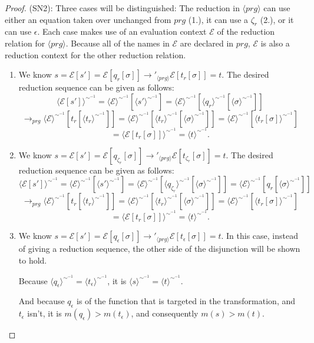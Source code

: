 \begin{proposition}
\begin{proof}
(SN2): Three cases will be distinguished: The reduction in $\langle prg \rangle$ can use either an equation taken over unchanged from $prg$ (1.), it can use a $\zeta_r$ (2.), or it can use $\epsilon$. Each case makes use of an evaluation context $\mathcal{E}$ of the reduction relation for $\langle prg \rangle$. Because all of the names in $\mathcal{E}$ are declared in $prg$, $\mathcal{E}$ is also a reduction context for the other reduction relation.
\begin{enumerate}
\item We know $s = \mathcal{E}[s'] = \mathcal{E}[q_r[\sigma]] \longrightarrow'_{\langle prg \rangle} \mathcal{E}[t_r[\sigma]] = t$. The desired reduction sequence can be given as follows:
\[
\langle \mathcal{E}[s'] \rangle^{\sim^{-1}} = \langle \mathcal{E} \rangle^{\sim^{-1}}[\langle s' \rangle^{\sim^{-1}}] = \langle \mathcal{E} \rangle^{\sim^{-1}}[\langle q_r \rangle^{\sim^{-1}}[\langle \sigma \rangle^{\sim^{-1}}]]
\]
\[
 \longrightarrow_{prg} \langle \mathcal{E} \rangle^{\sim^{-1}}[t_r[\langle t_r \rangle^{\sim^{-1}}]] = \langle \mathcal{E} \rangle^{\sim^{-1}}[\langle t_r \rangle^{\sim^{-1}}[\langle \sigma \rangle^{\sim^{-1}}]] = \langle \mathcal{E} \rangle^{\sim^{-1}}[\langle t_r[\sigma] \rangle^{\sim^{-1}}]
\]
\[
= \langle \mathcal{E}[t_r[\sigma]] \rangle^{\sim^{-1}} = \langle t \rangle^{\sim^{-1}}.
\]

\item We know $s = \mathcal{E}[s'] = \mathcal{E}[q_{\zeta_r}[\sigma]] \longrightarrow'_{\langle prg \rangle} \mathcal{E}[t_{\zeta_r}[\sigma]] = t$. The desired reduction sequence can be given as follows:
\[
\langle \mathcal{E}[s'] \rangle^{\sim^{-1}} = \langle \mathcal{E} \rangle^{\sim^{-1}}[\langle s' \rangle^{\sim^{-1}}] = \langle \mathcal{E} \rangle^{\sim^{-1}}[\langle q_{\zeta_r} \rangle^{\sim^{-1}}[\langle \sigma \rangle^{\sim^{-1}}]] = \langle \mathcal{E} \rangle^{\sim^{-1}}[q_r[\langle \sigma \rangle^{\sim^{-1}}]]
\]
\[
\longrightarrow_{prg} \langle \mathcal{E} \rangle^{\sim^{-1}}[t_r[\langle t_r \rangle^{\sim^{-1}}]] = \langle \mathcal{E} \rangle^{\sim^{-1}}[\langle t_r \rangle^{\sim^{-1}}[\langle \sigma \rangle^{\sim^{-1}}]] = \langle \mathcal{E} \rangle^{\sim^{-1}}[\langle t_r[\sigma] \rangle^{\sim^{-1}}]
\]
\[
= \langle \mathcal{E}[t_r[\sigma]] \rangle^{\sim^{-1}} = \langle t \rangle^{\sim^{-1}}.
\]

\item We know $s = \mathcal{E}[s'] = \mathcal{E}[q_\epsilon[\sigma]] \longrightarrow'_{\langle prg \rangle} \mathcal{E}[t_\epsilon[\sigma]] = t$. In this case, instead of giving a reduction sequence, the other side of the disjunction will be shown to hold.

Because $\langle q_\epsilon \rangle^{\sim^{-1}} = \langle t_\epsilon \rangle^{\sim^{-1}}$, it is $\langle s \rangle^{\sim^{-1}} = \langle t \rangle^{\sim^{-1}}$.

And because $q_\epsilon$ is of the function that is targeted in the transformation, and $t_\epsilon$ isn't, it is $m(q_\epsilon) > m(t_\epsilon)$, and consequently $m(s) > m(t)$.
\end{enumerate}
\end{proof}
\end{proposition}

